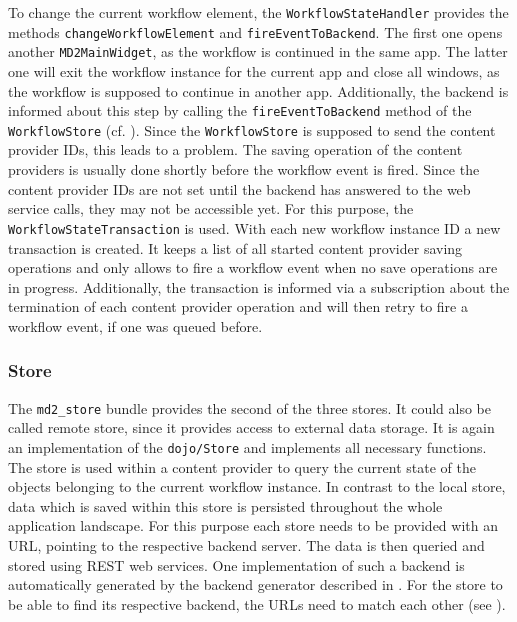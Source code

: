 To change the current workflow element, the \lstinline|WorkflowStateHandler| provides the methods \lstinline|change|\lstinline|WorkflowElement| and \lstinline|fireEventToBackend|. 
The first one opens another \lstinline|MD2MainWidget|, as the workflow is continued in the same app.
The latter one will exit the workflow instance for the current app and close all windows, as the workflow is supposed to continue in another app. Additionally, the backend is informed about this step by calling the \lstinline|fireEventToBackend| method of the \lstinline|WorkflowStore| (cf. ). Since the \lstinline|WorkflowStore| is supposed to send the content provider IDs, this leads to a problem. 
The saving operation of the content providers is usually done shortly before the workflow event is fired. Since the content provider IDs are not set until the backend has answered to the web service calls, they may not be accessible yet. For this purpose, the \lstinline|WorkflowStateTransaction| is used. 
With each new workflow instance ID a new transaction is created. It keeps a list of all started content provider saving operations and only allows to fire a workflow event when no save operations are in progress. Additionally, the transaction is informed via a subscription about the termination of each content provider operation and will then retry to fire a workflow event, if one was queued before.

\subsubsection{Store}\label{store}

The \lstinline|md2_store| bundle provides the second of the three stores. It could also be called remote store, since it provides access to external data storage. It is again an implementation of the \lstinline|dojo/Store| and implements all necessary functions. The store is used within a content provider to query the current state of the objects belonging to the current workflow instance. In contrast to the local store, data which is saved within this store is persisted throughout the whole application landscape. For this purpose each store needs to be provided with an URL, pointing to the respective backend server. The data is then queried and stored using REST web services. One implementation of such a backend is automatically generated by the backend generator described in . For the store to be able to find its respective backend, the URLs need to match each other (see ). 

